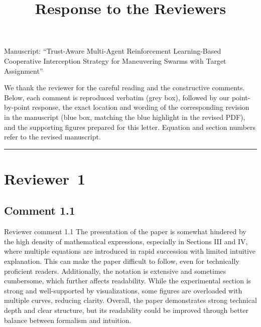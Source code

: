 \documentclass[11pt]{article}
\title{\vspace{-1.5em}Response to the Reviewers}
\date{}
\begin{document}
\maketitle
\vspace{-3em}
\begin{center}\small
Manuscript: ``Trust-Aware Multi-Agent Reinforcement Learning-Based Cooperative
Interception Strategy for Maneuvering Swarms with Target Assignment''
\end{center}
\bigskip

\noindent We thank the reviewer for the careful reading and the constructive
comments. Below, each comment is reproduced verbatim (grey box), followed by our
point-by-point response, the exact location and wording of the corresponding
revision in the manuscript (blue box, matching the blue highlight in the revised
PDF), and the supporting figures prepared for this letter. Equation and section
numbers refer to the revised manuscript.

\bigskip
\hrule
\bigskip

\section*{Reviewer~1}


\subsection*{Comment 1.1}

\begin{reviewercomment}{Reviewer comment 1.1}
The presentation of the paper is somewhat hindered by the high density of mathematical expressions, especially in Sections III and IV, where multiple equations are introduced in rapid succession with limited intuitive explanation. This can make the paper difficult to follow, even for technically proficient readers. Additionally, the notation is extensive and sometimes cumbersome, which further affects readability. While the experimental section is strong and well-supported by visualizations, some figures are overloaded with multiple curves, reducing clarity. Overall, the paper demonstrates strong technical depth and clear structure, but its readability could be improved through better balance between formalism and intuition.
\end{reviewercomment}
\end{document}
